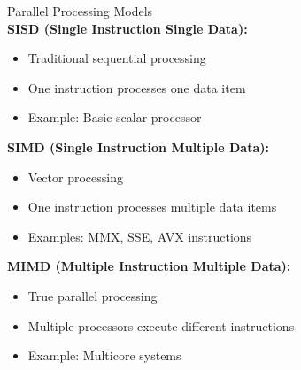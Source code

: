 \begin{concept}{Parallel Processing Models}\\
\textbf{SISD (Single Instruction Single Data):}
\begin{itemize}
  \item Traditional sequential processing
  \item One instruction processes one data item
  \item Example: Basic scalar processor
\end{itemize}

\textbf{SIMD (Single Instruction Multiple Data):}
\begin{itemize}
  \item Vector processing
  \item One instruction processes multiple data items
  \item Examples: MMX, SSE, AVX instructions
\end{itemize}

\textbf{MIMD (Multiple Instruction Multiple Data):}
\begin{itemize}
  \item True parallel processing
  \item Multiple processors execute different instructions
  \item Example: Multicore systems
\end{itemize}
\end{concept}

